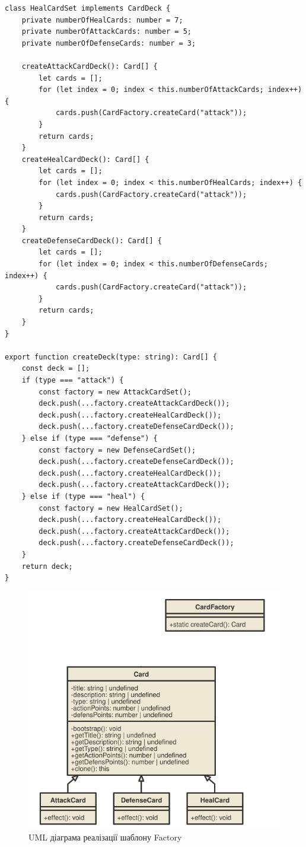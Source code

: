 \documentclass[oneside,14pt]{extarticle}
\begin{document}
\begin{normalsize}
\begin{small}
\begin{lstlisting}
class HealCardSet implements CardDeck {
	private numberOfHealCards: number = 7;
	private numberOfAttackCards: number = 5;
	private numberOfDefenseCards: number = 3;
	
	createAttackCardDeck(): Card[] {
		let cards = [];
		for (let index = 0; index < this.numberOfAttackCards; index++) {
			cards.push(CardFactory.createCard("attack"));
		}
		return cards;
	}
	createHealCardDeck(): Card[] {
		let cards = [];
		for (let index = 0; index < this.numberOfHealCards; index++) {
			cards.push(CardFactory.createCard("attack"));
		}
		return cards;
	}
	createDefenseCardDeck(): Card[] {
		let cards = [];
		for (let index = 0; index < this.numberOfDefenseCards; index++) {
			cards.push(CardFactory.createCard("attack"));
		}
		return cards;
	}
}

export function createDeck(type: string): Card[] {
	const deck = [];
	if (type === "attack") {
		const factory = new AttackCardSet();
		deck.push(...factory.createAttackCardDeck());
		deck.push(...factory.createHealCardDeck());
		deck.push(...factory.createDefenseCardDeck());
	} else if (type === "defense") {
		const factory = new DefenseCardSet();
		deck.push(...factory.createDefenseCardDeck());
		deck.push(...factory.createHealCardDeck());
		deck.push(...factory.createAttackCardDeck());
	} else if (type === "heal") {
		const factory = new HealCardSet();
		deck.push(...factory.createHealCardDeck());
		deck.push(...factory.createAttackCardDeck());
		deck.push(...factory.createDefenseCardDeck());
	}
	return deck;
}
		\end{lstlisting}
	\end{small}
	
	\begin{figure}[H]
		\centering
		\includegraphics[width=\textwidth]{factory}
		\caption{UML діаграма реалізації шаблону Factory}
	\end{figure}
	

\end{normalsize}
\end{document}
